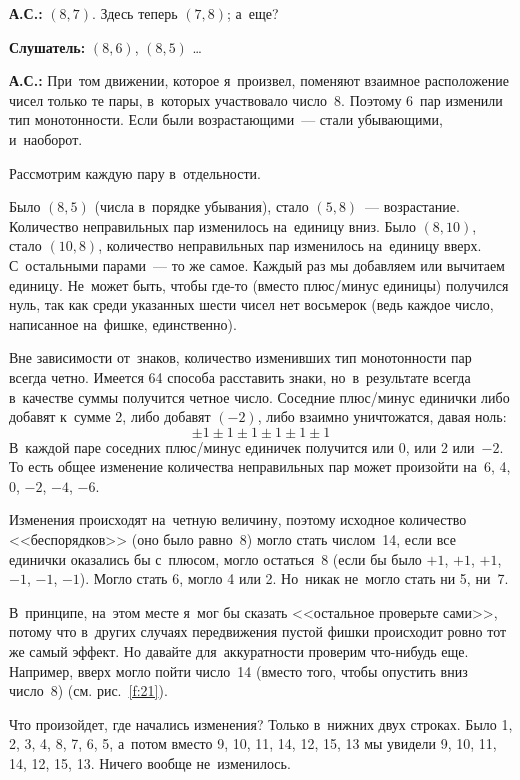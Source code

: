 \textbf{А.С.:} $(8, 7)$. Здесь теперь $(7, 8)$; а~еще?

\textbf{Слушатель:} $(8, 6)$, $(8, 5)$ \ldots

\textbf{А.С.:} При~том движении, которое я~произвел, поменяют взаимное расположение чисел
только те пары, в~которых участвовало число~8. Поэтому 6~пар изменили тип монотонности.
Если были возрастающими~--- стали убывающими, и~наоборот.

Рассмотрим каждую пару в~отдельности.

Было $(8, 5)$ (числа в~порядке убывания), стало $(5, 8)$~--- возрастание. Количество неправильных
пар изменилось на~единицу вниз. Было $(8, 10)$, стало $(10, 8)$, количество неправильных пар изменилось
на~единицу вверх. С~остальными парами~--- то же самое. Каждый раз мы добавляем или вычитаем
единицу. Не~может быть, чтобы где-то (вместо плюс/минус единицы) получился нуль, так как среди
указанных шести чисел нет восьмерок (ведь каждое число, написанное на~фишке, единственно).

Вне зависимости от~знаков, количество изменивших тип монотонности пар всегда четно. Имеется 64
способа расставить знаки, но~в~результате всегда в~качестве суммы получится четное число. Соседние
плюс/минус единички либо добавят к~сумме 2, либо добавят $(-2)$, либо взаимно уничтожатся, давая
ноль:
$$
\pm 1\pm 1\pm 1\pm 1\pm 1\pm 1
$$
В~каждой паре соседних плюс/минус единичек получится или 0, или 2 или~$-2$. То есть общее изменение
количества неправильных пар может произойти на~6, 4, 0, $-2$, $-4$, $-6$.

Изменения происходят на~четную величину, поэтому исходное количество <<беспорядков>> (оно было равно~8)
могло стать числом~14, если все единички оказались бы с~плюсом, могло остаться~8 (если бы было
$+1$, $+1$, $+1$, $-1$, $-1$, $-1$). Могло стать 6, могло 4 или 2. Но~никак не~могло стать ни 5, ни~7.

В~принципе, на~этом месте я~мог бы сказать <<остальное проверьте сами>>, потому что в~других случаях
передвижения пустой фишки происходит ровно тот же самый эффект. Но давайте для~аккуратности
проверим что-нибудь еще. Например, вверх могло пойти число~14 (вместо того, чтобы опустить вниз
число~8) (см. рис.~\ref{f:21}).


\pagebreak

Что произойдет, где начались изменения? Только в~нижних двух строках. Было 1, 2, 3, 4, 8, 7, 6, 5,
а~потом вместо 9, 10, 11, 14, 12, 15, 13 мы увидели 9, 10, 11, 14, 12, 15, 13. Ничего вообще
не~изменилось.

